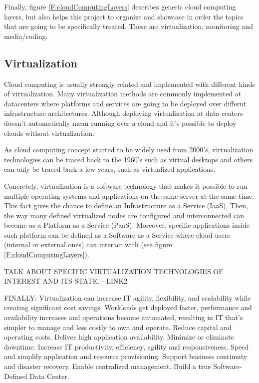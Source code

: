 Finally, figure \ref{F:cloudComputingLayers} describes generic cloud computing layers, but also helps this project to organize and showcase in order the topics that are going to be specifically treated. These are virtualization, monitoring and media/coding.

\subsection{Virtualization}

Cloud computing is usually strongly related and implemented with different kinds of virtualization. Many virtualization methods are commonly implemented at datacenters where platforms and services are going to be deployed over differnt infrastructure architectures. Although deploying virtualization at data centers doesn’t automatically mean running over a cloud and it’s possible to deploy clouds without virtualization.

As cloud computing concept started to be widely used from 2000's, virtualization  technologies can be traced back to the 1960’s such as virtual desktops and others can only be traced back a few years, such as virtualized applications.

Concretely, virtualization is a software technology that makes it possible to run multiple operating systems and applications on the same server at the same time. This fact gives the chance to define an Infrastructure as a Service (IaaS). Then, the way many defined virtualized nodes are configured and interconnected can become as a Platform as a Service (PaaS). Moreover, specific applications inside such platform can be defined as a Software as a Service where cloud users (internal or external ones) can interact with (see figure \ref{F:cloudComputingLayers}).



TALK ABOUT SPECIFIC VIRTUALIZATION TECHNOLOGIES OF INTEREST AND ITS STATE. - LINK2

FINALLY:
Virtualization can increase IT agility, flexibility, and scalability while creating significant cost savings. Workloads get deployed faster, performance and availability increases and operations become automated, resulting in IT that's simpler to manage and less costly to own and operate.
Reduce capital and operating costs.
Deliver high application availability.
Minimize or eliminate downtime.
Increase IT productivity, efficiency, agility and responsiveness.
Speed and simplify application and resource provisioning.
Support business continuity and disaster recovery.
Enable centralized management.
Build a true Software-Defined Data Center.


